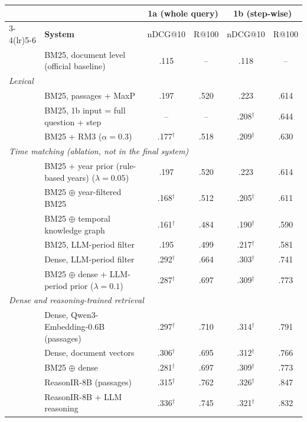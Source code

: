 \begin{table}[t]
\centering
\small
\begin{tabular}{llcccc}
\toprule
 & & \multicolumn{2}{c}{\textbf{1a (whole query)}} & \multicolumn{2}{c}{\textbf{1b (step-wise)}} \\
\cmidrule(lr){3-4}\cmidrule(lr){5-6}
& \textbf{System} & nDCG@10 & R@100 & nDCG@10 & R@100 \\
\midrule
& BM25, document level (official baseline) & .115 & -- & .118 & -- \\
\midrule
\multicolumn{6}{l}{\textit{Lexical}} \\
& BM25, passages + MaxP & .197 & .520 & .223 & .614 \\
& BM25, 1b input = full question + step & -- & -- & .208$^{\dagger}$ & .644 \\
& BM25 + RM3 ($\alpha{=}0.3$) & .177$^{\dagger}$ & .518 & .209$^{\dagger}$ & .630 \\
\midrule
\multicolumn{6}{l}{\textit{Time matching (ablation, not in the final system)}} \\
& BM25 + year prior (rule-based years) ($\lambda{=}0.05$) & .197 & .520 & .223 & .614 \\
& BM25 $\oplus$ year-filtered BM25 & .168$^{\dagger}$ & .512 & .205$^{\dagger}$ & .611 \\
& BM25 $\oplus$ temporal knowledge graph & .161$^{\dagger}$ & .484 & .190$^{\dagger}$ & .590 \\
& BM25, LLM-period filter & .195 & .499 & .217$^{\dagger}$ & .581 \\
& Dense, LLM-period filter & .292$^{\dagger}$ & .664 & .303$^{\dagger}$ & .741 \\
& BM25 $\oplus$ dense + LLM-period prior ($\lambda{=}0.1$) & .287$^{\dagger}$ & .697 & .309$^{\dagger}$ & .773 \\
\midrule
\multicolumn{6}{l}{\textit{Dense and reasoning-trained retrieval}} \\
& Dense, Qwen3-Embedding-0.6B (passages) & .297$^{\dagger}$ & .710 & .314$^{\dagger}$ & .791 \\
& Dense, document vectors & .306$^{\dagger}$ & .695 & .312$^{\dagger}$ & .766 \\
& BM25 $\oplus$ dense & .281$^{\dagger}$ & .697 & .309$^{\dagger}$ & .773 \\
& ReasonIR-8B (passages) & .315$^{\dagger}$ & .762 & .326$^{\dagger}$ & .847 \\
& ReasonIR-8B + LLM reasoning & .336$^{\dagger}$ & .745 & .321$^{\dagger}$ & .832 \\

\end{tabular}
\end{table}
